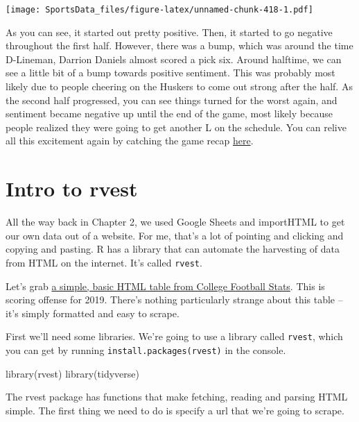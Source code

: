 \documentclass[
]{book}
\newenvironment{Shaded}{\begin{snugshade}}{\end{snugshade}}
\newcommand{\FunctionTok}[1]{\textcolor[rgb]{0.00,0.00,0.00}{#1}}
\newcommand{\NormalTok}[1]{#1}
\begin{document}
\texttt{[image: SportsData\_files/figure-latex/unnamed-chunk-418-1.pdf]}

As you can see, it started out pretty positive. Then, it started to go negative throughout the first half. However, there was a bump, which was around the time D-Lineman, Darrion Daniels almost scored a pick six. Around halftime, we can see a little bit of a bump towards positive sentiment. This was probably most likely due to people cheering on the Huskers to come out strong after the half. As the second half progressed, you can see things turned for the worst again, and sentiment became negative up until the end of the game, most likely because people realized they were going to get another L on the schedule. You can relive all this excitement again by catching the game recap \href{https://www.youtube.com/watch?v=m0hKH6Zb0vY\&feature=onebox}{here}.

\hypertarget{intro-to-rvest}{%
\chapter{Intro to rvest}\label{intro-to-rvest}}

All the way back in Chapter 2, we used Google Sheets and importHTML to get our own data out of a website. For me, that's a lot of pointing and clicking and copying and pasting. R has a library that can automate the harvesting of data from HTML on the internet. It's called \texttt{rvest}.

Let's grab \href{http://www.cfbstats.com/2019/leader/national/team/offense/split01/category09/sort01.html}{a simple, basic HTML table from College Football Stats}. This is scoring offense for 2019. There's nothing particularly strange about this table -- it's simply formatted and easy to scrape.

First we'll need some libraries. We're going to use a library called \texttt{rvest}, which you can get by running \texttt{install.packages(\textquotesingle{}rvest\textquotesingle{})} in the console.

\begin{Shaded}
\begin{Highlighting}[]
\FunctionTok{library}\NormalTok{(rvest)}
\FunctionTok{library}\NormalTok{(tidyverse)}
\end{Highlighting}
\end{Shaded}

The rvest package has functions that make fetching, reading and parsing HTML simple. The first thing we need to do is specify a url that we're going to scrape.
\end{document}
